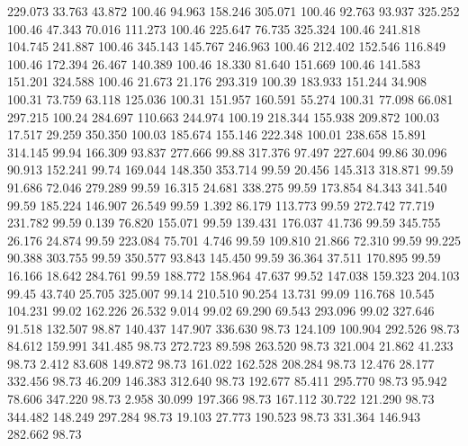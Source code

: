  229.073   33.763   43.872       100.46
  94.963  158.246  305.071       100.46
  92.763   93.937  325.252       100.46
  47.343   70.016  111.273       100.46
 225.647   76.735  325.324       100.46
 241.818  104.745  241.887       100.46
 345.143  145.767  246.963       100.46
 212.402  152.546  116.849       100.46
 172.394   26.467  140.389       100.46
  18.330   81.640  151.669       100.46
 141.583  151.201  324.588       100.46
  21.673   21.176  293.319       100.39
 183.933  151.244   34.908       100.31
  73.759   63.118  125.036       100.31
 151.957  160.591   55.274       100.31
  77.098   66.081  297.215       100.24
 284.697  110.663  244.974       100.19
 218.344  155.938  209.872       100.03
  17.517   29.259  350.350       100.03
 185.674  155.146  222.348       100.01
 238.658   15.891  314.145        99.94
 166.309   93.837  277.666        99.88
 317.376   97.497  227.604        99.86
  30.096   90.913  152.241        99.74
 169.044  148.350  353.714        99.59
  20.456  145.313  318.871        99.59
  91.686   72.046  279.289        99.59
  16.315   24.681  338.275        99.59
 173.854   84.343  341.540        99.59
 185.224  146.907   26.549        99.59
   1.392   86.179  113.773        99.59
 272.742   77.719  231.782        99.59
   0.139   76.820  155.071        99.59
 139.431  176.037   41.736        99.59
 345.755   26.176   24.874        99.59
 223.084   75.701    4.746        99.59
 109.810   21.866   72.310        99.59
  99.225   90.388  303.755        99.59
 350.577   93.843  145.450        99.59
  36.364   37.511  170.895        99.59
  16.166   18.642  284.761        99.59
 188.772  158.964   47.637        99.52
 147.038  159.323  204.103        99.45
  43.740   25.705  325.007        99.14
 210.510   90.254   13.731        99.09
 116.768   10.545  104.231        99.02
 162.226   26.532    9.014        99.02
  69.290   69.543  293.096        99.02
 327.646   91.518  132.507        98.87
 140.437  147.907  336.630        98.73
 124.109  100.904  292.526        98.73
  84.612  159.991  341.485        98.73
 272.723   89.598  263.520        98.73
 321.004   21.862   41.233        98.73
   2.412   83.608  149.872        98.73
 161.022  162.528  208.284        98.73
  12.476   28.177  332.456        98.73
  46.209  146.383  312.640        98.73
 192.677   85.411  295.770        98.73
  95.942   78.606  347.220        98.73
   2.958   30.099  197.366        98.73
 167.112   30.722  121.290        98.73
 344.482  148.249  297.284        98.73
  19.103   27.773  190.523        98.73
 331.364  146.943  282.662        98.73

